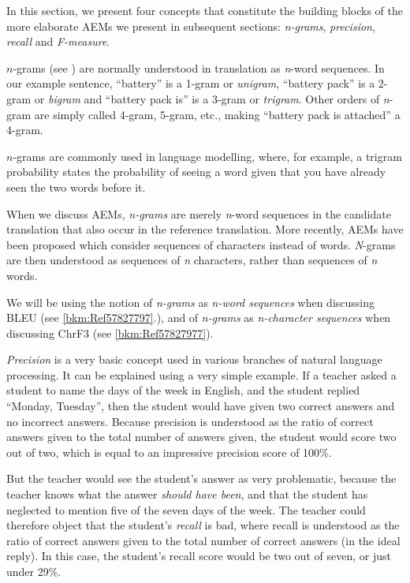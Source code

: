 \documentclass[output=paper]{langscibook}
\begin{document}
In this section, we present four concepts that constitute the building blocks of the more elaborate AEMs we present in subsequent sections: \textit{n-grams}, \textit{precision}, \textit{recall} and \textit{F-measure}.


$n$-grams (see ) are normally understood in translation as \textit{n}{}-word sequences. In our example sentence, “battery” is a 1-gram or \textit{unigram}, “battery pack” is a 2-gram or \textit{bigram} and “battery pack is” is a 3-gram or \textit{trigram}.  Other orders of \textit{n}-gram are simply called 4-gram, 5-gram, etc., making “battery pack is attached” a 4-gram.

$n$-grams are commonly used in language modelling, where, for example, a trigram probability states the probability of seeing a word given that you have already seen the two words before it.

When we discuss AEMs, \textit{n-grams} are merely \textit{n}{}-word sequences in the candidate translation that also occur in the reference translation. More recently, AEMs have been proposed which consider sequences of characters instead of words. \textit{N}{}-grams are then understood as sequences of \textit{n} characters, rather than sequences of \textit{n} words.

We will be using the notion of \textit{n-grams} as \textit{n-word sequences} when discussing BLEU (see \ref{bkm:Ref57827797}.), and of \textit{n-grams} as \textit{n-character sequences} when discussing ChrF3 (see \ref{bkm:Ref57827977}).


\textit{Precision} is a very basic concept used in various branches of natural language processing. It can be explained using a very simple example. If a teacher asked a student to name the days of the week in English, and the student replied “Monday, Tuesday”, then the student would have given two correct answers and no incorrect answers. Because precision is understood as the ratio of correct answers given to the total number of answers given, the student would score two out of two, which is equal to an impressive precision score of 100\%.

But the teacher would see the student’s answer as very problematic, because the teacher knows what the answer \textit{should have been}, and that the student has neglected to mention five of the seven days of the week. The teacher could therefore object that the student’s \textit{recall} is bad, where recall is understood as the ratio of correct answers given to the total number of correct answers (in the ideal reply). In this case, the student’s recall score would be two out of seven, or just under 29\%.
\end{document}
